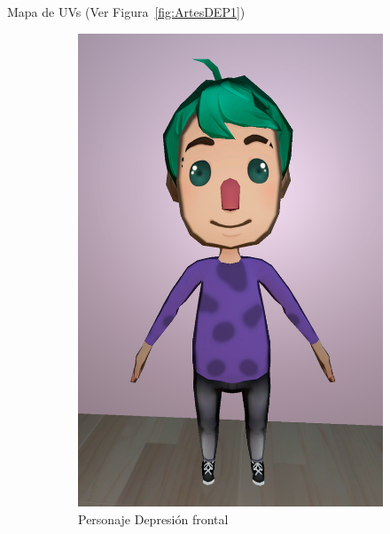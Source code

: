 \documentclass[12pt, a4paper,twoside,titlepage]{book}
\begin{document}
 Mapa de UVs (Ver Figura~\ref{fig:ArtesDEP1})
 
 \begin{figure}
\centering
\begin{subfigure}{.5\textwidth}
  \centering
  \includegraphics[width=.95\linewidth]{TGF/Artes/DEP_front.png}
  \caption{Personaje Depresión frontal}
\end{subfigure}%
\begin{subfigure}{.5\textwidth}
  \centering

\end{subfigure}
\end{figure}
\end{document}
